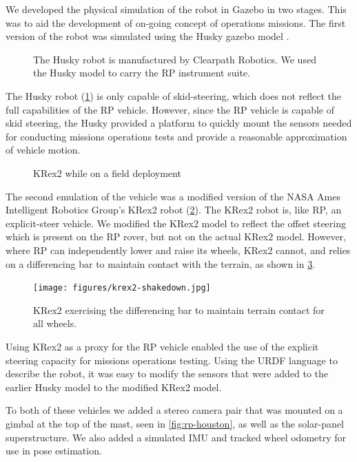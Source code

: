 \documentclass[twocolumn,letterpaper]{IEEEAerospaceCLS}  %
\begin{document}
We developed the physical simulation of the robot in Gazebo in two stages. 
This was to aid the development of on-going concept of operations missions.  
The first version of the robot was simulated using the Husky gazebo model \cite{gariepy2015husky}.  

\begin{figure}[htp]
\caption{The Husky robot is manufactured by Clearpath Robotics.  
We used the Husky model to carry the RP instrument suite. \label{fig:husky}}
\end{figure}

The Husky robot (\cref{fig:husky}) is only capable of skid-steering, which does not reflect the full capabilities of the RP vehicle.  
However, since the RP vehicle is capable of skid steering, the Husky provided a platform to quickly mount the sensors needed for conducting missions operations tests and provide a reasonable approximation of vehicle motion.  

\begin{figure}[htp]
\caption{KRex2 while on a field deployment \label{fig:krex2}}
\end{figure}

The second emulation of the vehicle was a modified version of the NASA Ames Intelligent Robotics Group's KRex2 robot (\cref{fig:krex2}).  
The KRex2 robot is, like RP, an explicit-steer vehicle.  
We modified the KRex2 model to reflect the offset steering which is present on the RP rover, but not on the actual KRex2 model.  
However, where RP can independently lower and raise its wheels, KRex2 cannot, and relies on a differencing bar to maintain contact with the terrain, as shown in \cref{fig:krex2-differencing}.    

\begin{figure}[htp]
\texttt{[image: figures/krex2-shakedown.jpg]}
\caption{KRex2 exercising the differencing bar to maintain terrain contact for all wheels. \label{fig:krex2-differencing}}
\end{figure}

Using KRex2 as a proxy for the RP vehicle enabled the use of the explicit steering capacity for missions operations testing.  
Using the URDF language to describe the robot, it was easy to modify the sensors that were added to the earlier Husky model to the modified KRex2 model.  


To both of these vehicles we added a stereo camera pair that was mounted on a gimbal at the top of the mast, seen in \cref{fig:rp-houston}, as well as the solar-panel superstructure. 
We also added a simulated IMU and tracked wheel odometry for use in pose estimation.  
\end{document}
